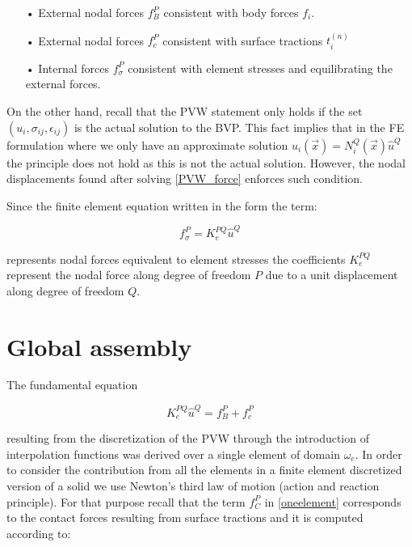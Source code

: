 \begin{itemize}
\item[•] External nodal forces $f_B^P$ consistent with body forces $f_i$.
\item[•] External nodal forces $f_c^P$ consistent with surface tractions $t_i^{(n)}$
\item[•] Internal forces $f_\sigma^P$ consistent with element stresses and equilibrating the external forces.
\end{itemize}

On the other hand, recall  that the PVW statement only holds if the set $(u_i , \sigma_{ij} , \epsilon_{ij})$ is the actual solution to the BVP. This fact implies that in the FE formulation where we only have an approximate solution $u_i(\overrightarrow x) =N_i^Q(\overrightarrow x)\widehat u^Q $ the principle does not hold as this is not the actual solution. However, the nodal displacements found after solving \cref{PVW_force} enforces such condition.

\begin{tcolorbox}

Since the finite element equation written in the form the term:

\[f_\sigma^P  =K_e^{PQ}\widehat u^Q\]

represents nodal forces equivalent to element stresses the coefficients $K_e^{PQ}$ represent the nodal force along degree of freedom $P$ due to a unit displacement along degree of freedom $Q.$

\end{tcolorbox}


\section{Global assembly}

The fundamental equation

\begin{equation}
K_e^{PQ}\widehat u^Q =f_B^P+f_c^P
\label{oneelement}
\end{equation}

resulting from the discretization of the PVW through the introduction of interpolation functions was derived over a single element of domain $\omega_e$. In order to consider the contribution from all the elements in a finite element discretized version of a solid we use Newton's third law of motion (action and reaction principle). For that purpose recall that the term $f_C^P$ in \cref{oneelement} corresponds to the contact forces resulting from surface tractions and it is computed according to:

